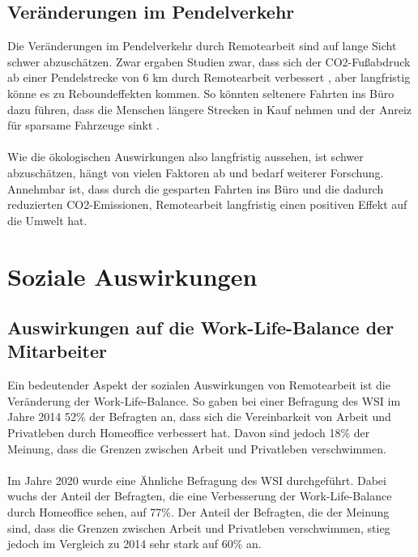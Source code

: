 \documentclass[runningheads]{llncs}
\begin{document}
\subsection{Veränderungen im Pendelverkehr}

Die Veränderungen im Pendelverkehr durch Remotearbeit sind auf lange Sicht schwer abzuschätzen.
Zwar ergaben Studien zwar, dass sich der CO2-Fußabdruck ab einer Pendelstrecke von 6 km durch Remotearbeit verbessert \cite{daniel_crow_working_2022}, aber langfristig könne es zu Reboundeffekten kommen.
So könnten seltenere Fahrten ins Büro dazu führen, dass die Menschen längere Strecken in Kauf nehmen und der Anreiz für sparsame Fahrzeuge sinkt \cite{waldemar_marz_reduziert_2022}.\\\\
Wie die ökologischen Auswirkungen also langfristig aussehen, ist schwer abzuschätzen, hängt von vielen Faktoren ab und bedarf weiterer Forschung.
Annehmbar ist, dass durch die gesparten Fahrten ins Büro und die dadurch reduzierten CO2-Emissionen, Remotearbeit langfristig einen positiven Effekt auf die Umwelt hat.

\section{Soziale Auswirkungen}

\subsection{Auswirkungen auf die Work-Life-Balance der Mitarbeiter}

Ein bedeutender Aspekt der sozialen Auswirkungen von Remotearbeit ist die Veränderung der Work-Life-Balance. So gaben bei einer Befragung des WSI im Jahre 2014 52\% der Befragten an, dass sich die Vereinbarkeit von Arbeit und Privatleben durch Homeoffice verbessert hat. Davon sind jedoch 18\% der Meinung, dass die Grenzen zwischen Arbeit und Privatleben verschwimmen. \cite{wsi_wsi_2014}
\\\\
Im Jahre 2020 wurde eine Ähnliche Befragung des WSI durchgeführt. Dabei wuchs der Anteil der Befragten, die eine Verbesserung der Work-Life-Balance durch Homeoffice sehen, auf 77\%. Der Anteil der Befragten, die der Meinung sind, dass die Grenzen zwischen Arbeit und Privatleben verschwimmen, stieg jedoch im Vergleich zu 2014 sehr stark auf 60\% an. \cite{wsi_homeoffice_2020}

\end{document}
